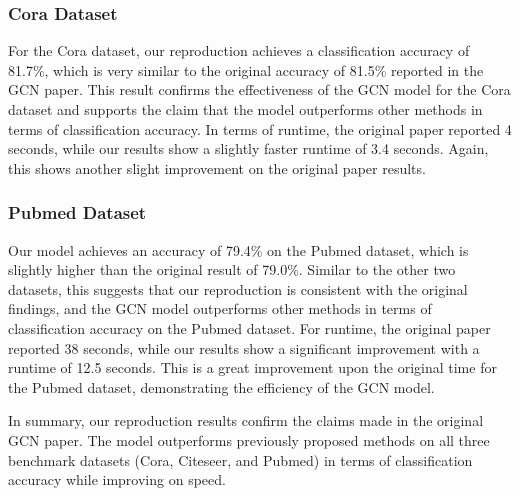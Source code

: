 \documentclass[11pt,a4paper]{article}
\begin{document}
\subsubsection{Cora Dataset}

For the Cora dataset, our reproduction achieves a classification accuracy of 81.7\%, which is very similar to the original accuracy of 81.5\% reported in the GCN paper. This result confirms the effectiveness of the GCN model for the Cora dataset and supports the claim that the model outperforms other methods in terms of classification accuracy. In terms of runtime, the original paper reported 4 seconds, while our results show a slightly faster runtime of 3.4 seconds. Again, this shows another slight improvement on the original paper results.

\subsubsection{Pubmed Dataset}

Our model achieves an accuracy of 79.4\% on the Pubmed dataset, which is slightly higher than the original result of 79.0\%. Similar to the other two datasets, this suggests that our reproduction is consistent with the original findings, and the GCN model outperforms other methods in terms of classification accuracy on the Pubmed dataset. For runtime, the original paper reported 38 seconds, while our results show a significant improvement with a runtime of 12.5 seconds. This is a great improvement upon the original time for the Pubmed dataset, demonstrating the efficiency of the GCN model.

In summary, our reproduction results confirm the claims made in the original GCN paper. The model outperforms previously proposed methods on all three benchmark datasets (Cora, Citeseer, and Pubmed) in terms of classification accuracy while improving on speed.


\end{document}
